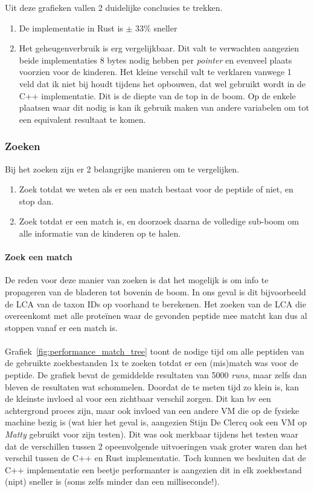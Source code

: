 Uit deze grafieken vallen 2 duidelijke conclusies te trekken.
\begin{enumerate}
    \item De implementatie in Rust is $\pm$ 33\% sneller
    \item Het geheugenverbruik is erg vergelijkbaar.
    Dit valt te verwachten aangezien beide implementaties 8 bytes nodig hebben per \textit{pointer} en evenveel plaats voorzien voor de kinderen.
    Het kleine verschil valt te verklaren vanwege 1 veld dat ik niet bij houdt tijdens het opbouwen, dat wel gebruikt wordt in de C++ implementatie.
    Dit is de diepte van de top in de boom.
    Op de enkele plaatsen waar dit nodig is kan ik gebruik maken van andere variabelen om tot een equivalent resultaat te komen.
\end{enumerate}

\subsubsection{Zoeken}
Bij het zoeken zijn er 2 belangrijke manieren om te vergelijken.
\begin{enumerate}
    \item Zoek totdat we weten als er een match bestaat voor de peptide of niet, en stop dan.
    \item Zoek totdat er een match is, en doorzoek daarna de volledige sub-boom om alle informatie van de kinderen op te halen.

\end{enumerate}

\paragraph{Zoek een match}
De reden voor deze manier van zoeken is dat het mogelijk is om info te propageren van de bladeren tot bovenin de boom.
In ons geval is dit bijvoorbeeld de LCA van de taxon IDs op voorhand te berekenen.
Het zoeken van de LCA die overeenkomt met alle proteïnen waar de gevonden peptide mee matcht kan dus al stoppen vanaf er een match is.
\\ \\
Grafiek~\ref{fig:performance_match_tree} toont de nodige tijd om alle peptiden van de gebruikte zoekbestanden 1x te zoeken totdat er een (mis)match was voor de peptide.
De grafiek bevat de gemiddelde resultaten van 5000 \textit{runs}, maar zelfs dan bleven de resultaten wat schommelen.
Doordat de te meten tijd zo klein is, kan de kleinste invloed al voor een zichtbaar verschil zorgen.
Dit kan bv een achtergrond proces zijn, maar ook invloed van een andere VM die op de fysieke machine bezig is (wat hier het geval is, aangezien Stijn De Clercq ook een VM op \textit{Matty} gebruikt voor zijn testen).
Dit was ook merkbaar tijdens het testen waar dat de verschillen tussen 2 opeenvolgende uitvoeringen vaak groter waren dan het verschil tussen de C++ en Rust implementatie.
Toch kunnen we besluiten dat de C++ implementatie een beetje performanter is aangezien dit in elk zoekbestand (nipt) sneller is (soms zelfs minder dan een milliseconde!).

